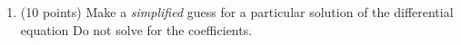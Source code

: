 \documentclass[12pt]{article}
\def\vx{\vec {\mathbf{x}}}
\newcommand{\tred}[1]{{\color{black}{#1}}}
\begin{document}
\begin{enumerate}
\newpage

\vspace*{-.5in}


        \item (10 points) Make a \textit{simplified} guess for a particular solution of
    the differential equation \tred{
    \[
     (D+2)^3 (D^2+1)^2 \,\vx = t e^{-2t} + \sin t.
    \] }
    Do not solve for the coefficients.
  \end{enumerate}
  
  
\end{document}
